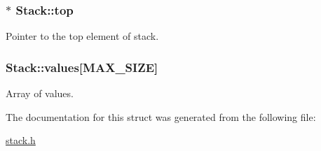 \subsubsection[{top}]{$\ast$ Stack\+::top}\label{structStack_a0d3673185c9d5e796ef049c9d3fcc890}
Pointer to the top element of stack. \hypertarget{structStack_ac2f6dee0e1fb8ef2549341f8653f8042}{}
\subsubsection[{values}]{ Stack\+::values\mbox{[}{\bf M\+A\+X\+\_\+\+S\+I\+Z\+E}\mbox{]}}\label{structStack_ac2f6dee0e1fb8ef2549341f8653f8042}
Array of values. 

The documentation for this struct was generated from the following file\+:\begin{DoxyCompactItemize}
\item 
\hyperlink{stack_8h}{stack.\+h}\end{DoxyCompactItemize}
